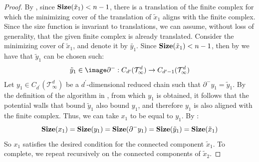 \begin{proof}
By , since $\mathbf{Size}(\tilde{x}_{1}) < n-1$, there is a translation of the finite complex for which the minimizing cover of the translation of $\tilde{x}_{1}$ aligns with the finite complex. Since the size function is invariant to translations, we can assume, without loss of generality, that the given finite complex is already translated. Consider the minimizing cover of $\tilde{x}_{1}$, and denote it by $\tilde{y_1}$. Since $\mathbf{Size}(\tilde{x}_{1}) < n-1$, then by  we have that $\tilde{y}_{1}$ can be chosen such:
\begin{equation*}
  \begin{split}
    \tilde{y}_{1} \in \image \partial^{-} : C_{d^{\prime}}(\mathcal T_\infty^d) \rightarrow C_{d^{\prime}-1}(\mathcal T_\infty^d)
  \end{split}
\end{equation*}
Let $y_{1} \in C_{d^{\prime}}(\mathcal T_\infty^d) $ be a $d^{\prime}$-dimensional reduced chain such that $\partial^{-}y_{1} = \tilde{y}_{1}$. By the definition of the algorithm in , from which $y_{1}$ is obtained, it follows that the potential walls that bound $\tilde{y}_{1}$ also bound $y_{1}$, and therefore $y_{1}$ is also aligned with the finite complex. Thus, we can take $x_{1}$ to be equal to $y_{1}$. By :
\begin{equation*}
  \begin{split}
    \mathbf{Size}(x_{1}) = \mathbf{Size}(y_{1}) = \mathbf{Size}(\partial^{-}y_{1}) = \mathbf{Size}(\tilde{y}_{1}) = \mathbf{Size}(\tilde{x}_{1})
  \end{split}
\end{equation*}
So $x_{1}$ satisfies the desired condition for the connected component $\tilde{x}_{1}$. To complete, we repeat recursively on the connected components of $\tilde{x}_{2}$. 
\end{proof}


